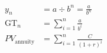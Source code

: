 \begin{align}
    y_n &= a \div b^n = \frac{a}{b^n} \\
    \text{GT}_n &= \sum_{i=1}^n \frac{a}{b^i} \\
    PV_{\text{annuity}} &= \sum_{i=1}^n \frac{C}{(1+r)^i}
\end{align}
